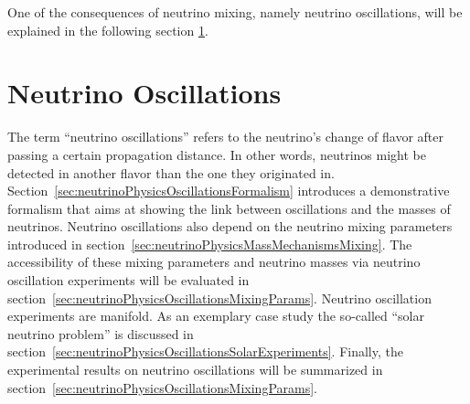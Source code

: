One of the consequences of neutrino mixing, namely neutrino oscillations, will be explained in the following section \ref{sec:neutrinoPhysicsOscillations}.

\section{Neutrino Oscillations}
\label{sec:neutrinoPhysicsOscillations}
The term ``neutrino oscillations'' refers to the neutrino's change of flavor after passing a certain propagation distance. In other words, neutrinos might be detected in another flavor than the one they originated in.
Section~\ref{sec:neutrinoPhysicsOscillationsFormalism} introduces a demonstrative formalism that aims at showing the link between oscillations and the masses of neutrinos. Neutrino oscillations also depend on the neutrino mixing parameters introduced in section~\ref{sec:neutrinoPhysicsMassMechanismsMixing}. The accessibility of these mixing parameters and neutrino masses via neutrino oscillation experiments will be evaluated in section~\ref{sec:neutrinoPhysicsOscillationsMixingParams}. Neutrino oscillation experiments are manifold. As an exemplary case study the so-called ``solar neutrino problem'' is discussed in section~\ref{sec:neutrinoPhysicsOscillationsSolarExperiments}. Finally, the experimental results on neutrino oscillations will be summarized in section~\ref{sec:neutrinoPhysicsOscillationsMixingParams}. 

